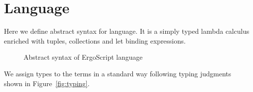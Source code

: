 \section{Language}
\label{sec:language}

Here we define abstract syntax for \langname language. It is a simply typed
lambda calculus enriched with tuples, collections and let binding
expressions.

\begin{figure}[h]
    \footnotesize
    
    \caption{Abstract syntax of ErgoScript language}
    \label{fig:language}
\end{figure}
    
We assign types to the terms in a standard way following typing judgments
shown in Figure~\ref{fig:typing}.
